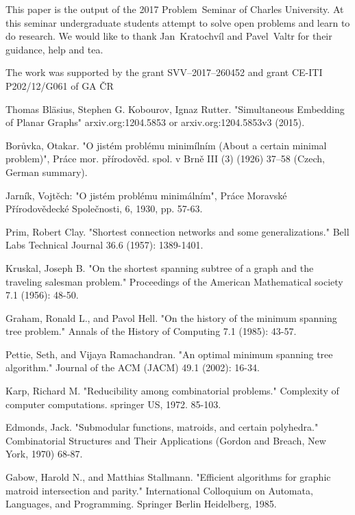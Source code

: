 \documentclass{llncs}
\begin{document}
This paper is the output of the 2017 Problem~Seminar of Charles University. At this seminar undergraduate students attempt to solve open problems and learn to do research. We would like to thank Jan~Kratochv\'{i}l and Pavel~Valtr for their guidance, help and tea. 

The work was supported by the grant SVV--2017--260452 and grant CE-ITI P202/12/G061 of GA \v{C}R 






\begin{thebibliography}{9}
Thomas Bläsius, Stephen G. Kobourov, Ignaz Rutter. "Simultaneous Embedding of Planar Graphs" arxiv.org:1204.5853 or arxiv.org:1204.5853v3 (2015).

Borůvka, Otakar. "O jistém problému minimílním (About a certain minimal problem)", Práce mor. přírodověd. spol. v Brně III (3) (1926) 37–58 (Czech, German summary).

Jarník, Vojtěch: "O jistém problému minimálním", Práce Moravské Přírodovědecké Společnosti, 6, 1930, pp. 57-63.

Prim, Robert Clay. "Shortest connection networks and some generalizations." Bell Labs Technical Journal 36.6 (1957): 1389-1401.

Kruskal, Joseph B. "On the shortest spanning subtree of a graph and the traveling salesman problem." Proceedings of the American Mathematical society 7.1 (1956): 48-50.

Graham, Ronald L., and Pavol Hell. "On the history of the minimum spanning tree problem." Annals of the History of Computing 7.1 (1985): 43-57.

Pettie, Seth, and Vijaya Ramachandran. "An optimal minimum spanning tree algorithm." Journal of the ACM (JACM) 49.1 (2002): 16-34.

Karp, Richard M. "Reducibility among combinatorial problems." Complexity of computer computations. springer US, 1972. 85-103.

Edmonds, Jack. "Submodular functions, matroids, and certain polyhedra." Combinatorial Structures and Their Applications (Gordon and Breach, New York, 1970) 68-87. 

Gabow, Harold N., and Matthias Stallmann. "Efficient algorithms for graphic matroid intersection and parity." International Colloquium on Automata, Languages, and Programming. Springer Berlin Heidelberg, 1985.
\end{thebibliography}
\end{document}
